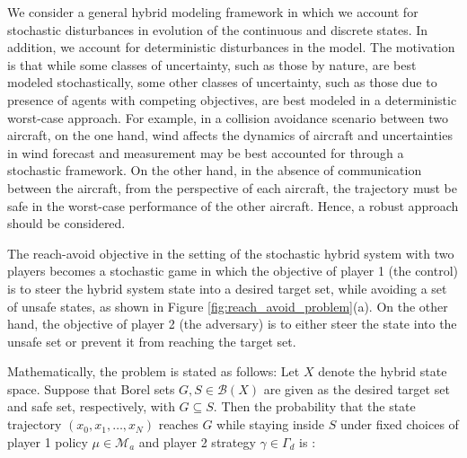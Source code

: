                  We consider a general hybrid modeling framework in
                 which we account for stochastic disturbances in
                 evolution of the continuous and discrete states. In
                 addition, we account for deterministic disturbances
                 in the model. The motivation is that while some
                 classes of uncertainty, such as those by nature, are
                 best modeled stochastically, some other classes of
                 uncertainty, such as those due to presence of agents
                 with competing objectives, are best modeled in a
                 deterministic worst-case approach. For example, in a
                 collision avoidance scenario between two aircraft, on
                 the one hand, wind affects the dynamics of aircraft
                 and uncertainties in wind forecast and measurement
                 may be best accounted for through a stochastic
                 framework. On the other hand, in the absence of
                 communication between the aircraft, from the
                 perspective of each aircraft, the trajectory must be
                 safe in the worst-case performance of the other
                 aircraft. Hence, a robust approach should be
                 considered.

                 The reach-avoid objective in the setting of the
                 stochastic hybrid system with two players becomes a
                 stochastic game in which the objective of player 1
                 (the control) is to steer the hybrid system state
                 into a desired target set, while avoiding a set of
                 unsafe states, as shown in Figure
                 \ref{fig:reach_avoid_problem}(a).  On the other hand,
                 the objective of player 2 (the adversary) is to
                 either steer the state into the unsafe set or prevent
                 it from reaching the target set.

                 Mathematically, the problem is stated as follows: Let
                 $X$ denote the hybrid state space. Suppose that Borel
                 sets $G, S \in \mathcal{B}(X)$ are given as the
                 desired target set and safe set, respectively, with
                 $G \subseteq S$.  Then the probability that the state
                 trajectory $(x_0, x_1, \dots, x_N)$ reaches $G$ while
                 staying inside $S$ under fixed choices of player 1
                 policy $\mu \in \mathcal{M}_a$ and player 2 strategy
                 $\gamma \in \Gamma_d$ is \cite{kamgar2011cdc}:

